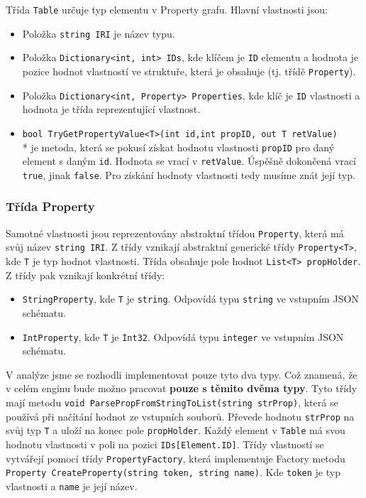 Třída \texttt{Table} určuje typ elementu v Property grafu.
Hlavní vlastnosti jsou:
\begin{itemize}
\item Položka \texttt{string IRI} je název typu.
\item Položka \texttt{Dictionary<int, int> IDs}, kde klíčem je \texttt{ID} elementu a hodnota je pozice hodnot vlastností ve struktuře, která je obsahuje (tj. třídě \texttt{Property}).
\item Položka \texttt{Dictionary<int, Property> Properties}, kde klíč je \texttt{ID} vlastnosti a hodnota je třída reprezentující vlastnost.
\item \texttt{bool TryGetPropertyValue<T>(int id,int propID, out T retValue)}\\* 
je metoda, která se pokusí získat hodnotu vlastnosti \texttt{propID} pro daný element s daným \texttt{id}.
Hodnota se vrací v \texttt{retValue}. Úspěšně dokončená vrací \texttt{true}, jinak \texttt{false}.
Pro získání hodnoty vlastnosti tedy musíme znát její typ.
\end{itemize}

\subsubsection{Třída Property}

Samotné vlastnosti jsou reprezentovány abstraktní třídou \texttt{Property}, která má svůj název \texttt{string IRI}.
Z třídy vznikají abstraktní generické třídy \texttt{Property<T>}, kde \texttt{T} je typ hodnot vlastnosti.
Třída obsahuje pole hodnot \texttt{List<T> propHolder}.
Z třídy pak vznikají konkrétní třídy:
\begin{itemize}
\item \texttt{StringProperty}, kde \texttt{T} je \texttt{string}. Odpovídá typu \texttt{string} ve vstupním JSON schématu.
\item \texttt{IntProperty}, kde \texttt{T} je \texttt{Int32}. Odpovídá typu \texttt{integer} ve vstupním JSON schématu.
\end{itemize}
V analýze jsme se rozhodli implementovat pouze tyto dva typy. 
Což znamená, že v celém enginu bude možno pracovat \textbf{pouze s těmito dvěma typy}.
Tyto třídy mají metodu \texttt{void ParsePropFromStringToList(string strProp)}, která se používá při načítání hodnot ze vstupních souborů.
Převede hodnotu \texttt{strProp} na svůj typ \texttt{T} a uloží na konec pole \texttt{propHolder}.
Každý element v \texttt{Table} má svou hodnotu vlastnosti v poli na pozici \texttt{IDs[Element.ID]}.
Třídy vlastností se vytvářejí pomocí třídy \texttt{PropertyFactory}, která implementuje Factory metodu \citep[str. 107]{patterns} \texttt{Property CreateProperty(string token, string name)}.
Kde \texttt{token} je typ vlastnosti a \texttt{name} je její název.

